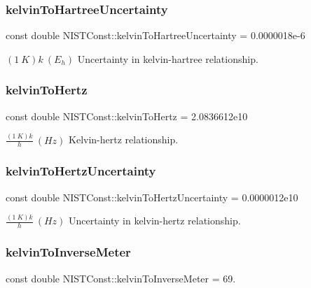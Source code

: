 \subsubsection{\texorpdfstring{kelvin\+To\+Hartree\+Uncertainty}{kelvinToHartreeUncertainty}}
{\footnotesize\ttfamily const double N\+I\+S\+T\+Const\+::kelvin\+To\+Hartree\+Uncertainty = 0.\+0000018e-\/6}

$(1\ K)k \ (E_h)$ Uncertainty in kelvin-\/hartree relationship. \mbox{\label{group___n_i_s_t_const-_kelvin_gaa426666c20c9b04efcdcfd05f5a90cd9}} 
\subsubsection{\texorpdfstring{kelvin\+To\+Hertz}{kelvinToHertz}}
{\footnotesize\ttfamily const double N\+I\+S\+T\+Const\+::kelvin\+To\+Hertz = 2.\+0836612e10}

$\frac{(1\ K)k}{h} \ (Hz)$ Kelvin-\/hertz relationship. \mbox{\label{group___n_i_s_t_const-_kelvin_gaab1ae20957d14cd50d787ad307a1a45d}} 
\subsubsection{\texorpdfstring{kelvin\+To\+Hertz\+Uncertainty}{kelvinToHertzUncertainty}}
{\footnotesize\ttfamily const double N\+I\+S\+T\+Const\+::kelvin\+To\+Hertz\+Uncertainty = 0.\+0000012e10}

$\frac{(1\ K)k}{h} \ (Hz)$ Uncertainty in kelvin-\/hertz relationship. \mbox{\label{group___n_i_s_t_const-_kelvin_ga361938b994609879a0377a94e49dacf2}} 
\subsubsection{\texorpdfstring{kelvin\+To\+Inverse\+Meter}{kelvinToInverseMeter}}
{\footnotesize\ttfamily const double N\+I\+S\+T\+Const\+::kelvin\+To\+Inverse\+Meter = 69.}

